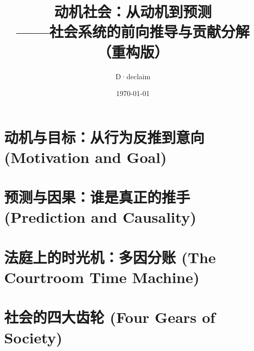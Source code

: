 \documentclass[openany, a4paper, 12pt]{book}
\title{\textbf{动机社会：从动机到预测}\\ \large ——社会系统的前向推导与贡献分解（重构版）}
\author{D·declaim}
\date{\today}
\begin{document}
	\maketitle      %

	\frontmatter
	
	\tableofcontents %

	\mainmatter     %

	

	\part{动机与目标：从行为反推到意向 (Motivation and Goal)}
	
	

	\part{预测与因果：谁是真正的推手 (Prediction and Causality)}
	
	

	\part{法庭上的时光机：多因分账 (The Courtroom Time Machine)}
	

	\part{社会的四大齿轮 (Four Gears of Society)}
	
	
	
	
	
\end{document}
